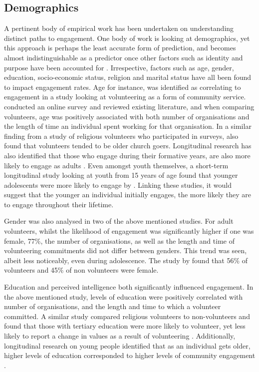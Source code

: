 \subsection{Demographics}
A pertinent body of empirical work has been undertaken on understanding distinct paths to engagement. One body of work is looking at demographics, yet this approach is perhaps the least accurate form of prediction, and becomes almost indistinguishable as a predictor once other factors such as identity and purpose have been accounted for \citep{Taylor2007}. Irrespective, factors such as age, gender, education, socio-economic status, religion and marital status have all been found to impact engagement rates. Age for instance, was identified as correlating to engagement in a study looking at volunteering as a form of community service. \citet{Penner2002} conducted an online survey and reviewed existing literature, and when comparing volunteers, age was positively associated with both number of organisations and the length of time an individual spent working for that organisation. In a similar finding from a study of religious volunteers who participated in surveys, \citet{Garland2008} also found that volunteers tended to be older church goers. Longitudinal research has also identified that those who engage during their formative years, are also more likely to engage as adults \citep{Barber2013}. Even amongst youth themselves, a short-term longitudinal study looking at youth from 15 years of age found that younger adolescents were more likely to engage by \citep{Cemalcilar2009}. Linking these studies, it would suggest that the younger an individual initially engages, the more likely they are to engage throughout their lifetime. 

Gender was also analysed in two of the above mentioned studies. For adult volunteers, whilst the likelihood of engagement was significantly higher if one was female, 77\%, the number of organisations, as well as the length and time of volunteering commitments did not differ between genders. This trend was seen, albeit less noticeably, even during adolescence. The study by \citet{Cemalcilar2009} found that 56\% of volunteers and 45\% of non volunteers were female. 

Education and perceived intelligence both significantly influenced engagement. In the above mentioned \citet{Penner2002} study, levels of education were positively correlated with number of organisations, and the length and time to which a volunteer committed. A similar study compared religious volunteers to non-volunteers and found that those with tertiary education were more likely to volunteer, yet less likely to report a change in values as a result of volunteering \citep{Garland2008}. Additionally, longitudinal research on young people identified that as an individual gets older, higher levels of education corresponded to higher levels of community engagement \citep{Barber2013}.

